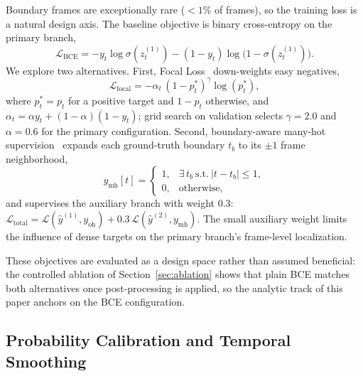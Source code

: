 Boundary frames are exceptionally rare ($<1\%$ of frames), so the training
loss is a natural design axis. The baseline objective is binary
cross-entropy on the primary branch,
\begin{equation}
    \mathcal{L}_{\mathrm{BCE}}
    = -y_t\log\sigma(z^{(1)}_t)-(1-y_t)\log\bigl(1-\sigma(z^{(1)}_t)\bigr).
    \label{eq:bce}
\end{equation}
We explore two alternatives. First, Focal Loss~\cite{lin2017focal}
down-weights easy negatives,
\begin{equation}
    \mathcal{L}_{\mathrm{focal}} = -\alpha_t\,(1-p^{*}_t)^{\gamma}\log(p^{*}_t),
    \label{eq:focal}
\end{equation}
where $p^{*}_t=p_t$ for a positive target and $1-p_t$ otherwise, and
$\alpha_t=\alpha y_t+(1-\alpha)(1-y_t)$; grid search on validation selects
$\gamma=2.0$ and $\alpha=0.6$ for the primary configuration. Second, boundary-aware many-hot
supervision~\cite{muller2019label} expands each ground-truth boundary $t_b$
to its $\pm1$ frame neighborhood,
\begin{equation}
    y_{\mathrm{mh}}[t]=\begin{cases}1, & \exists\, t_b\ \text{s.t.}\ |t-t_b|\le 1,\\ 0, & \text{otherwise},\end{cases}
    \label{eq:manyhot}
\end{equation}
and supervises the auxiliary branch with weight 0.3:
$\mathcal{L}_{\mathrm{total}}=\mathcal{L}(\hat y^{(1)}, y_{\mathrm{oh}})
+0.3\,\mathcal{L}(\hat y^{(2)}, y_{\mathrm{mh}})$. The small auxiliary
weight limits the influence of dense targets on the primary branch's
frame-level localization.

These objectives are evaluated as a design space rather than assumed
beneficial: the controlled ablation of Section~\ref{sec:ablation} shows that
plain BCE matches both alternatives once post-processing is applied, so the
analytic track of this paper anchors on the BCE configuration.

\subsection{Probability Calibration and Temporal Smoothing}
\label{sec:postprocess}

